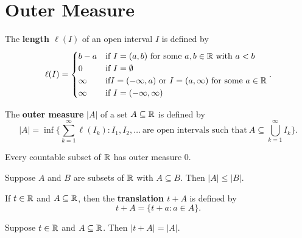 \documentclass[a4paper]{article}
\begin{document}
\section{Outer Measure}

\begin{definition}
   The \textbf{length \( \ell(I) \)} of an open interval \( I  \) is defined by 
   \[  \ell(I) = 
   \begin{cases}
       b - a &\text{if} \ I = (a,b) \ \text{for some} \ a,b \in \R \ \text{with} \ a < b \\
       0 &\text{if} \ I = \emptyset \\
       \infty &\text{if} I = (-\infty,a) \ \text{or} \ I = (a,\infty) \ \text{for some} \  a \in \R \\
       \infty  &\text{if} \ I = (-\infty , \infty )
   \end{cases}. 
\]
\end{definition}


\begin{definition}
    The \textbf{outer measure} \( | A  |  \) of a set \( A \subseteq \mathbb{R}  \) is defined by
    \[  | A  |  = \inf \Big\{ \sum_{ k=1  }^{ \infty  } \ell({I}_{k}): {I}_{1}, {I}_{2}, \dots  \ \text{are open intervals such that} \ A \subseteq \bigcup_{ k=1  }^{ \infty  }  {I}_{k}  \Big\}.  \]
\end{definition}

\begin{prop}
   Every countable subset of \( \mathbb{R}  \) has outer measure \( 0  \). 
\end{prop}

\begin{prop}
   Suppose \( A  \) and \( B  \) are subsets of \( \mathbb{R}  \) with \( A \subseteq  B  \). Then \( | A  | \leq | B |  \). 
\end{prop}

\begin{definition}[Translation; \( t + A  \)]
   If \( t \in \mathbb{R}  \) and \( A \subseteq  \mathbb{R}  \), then the \textbf{translation \( t + A \)} is defined by 
   \[ t + A = \{ t + a : a \in  A  \}.  \]
\end{definition}

\begin{prop}
   Suppose \( t \in \mathbb{R}  \) and \( A \subseteq  \mathbb{R}  \). Then \( | t + A  |  = | A  |  \).  
\end{prop}
\end{document}
